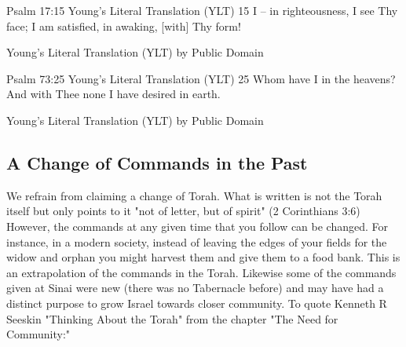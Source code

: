 \documentclass[11pt]{article}
\begin{document}
Psalm 17:15 Young's Literal Translation (YLT)
15 I -- in righteousness, I see Thy face; I am satisfied, in awaking, [with] Thy form!

Young's Literal Translation (YLT)
by Public Domain

Psalm 73:25 Young's Literal Translation (YLT)
25 Whom have I in the heavens? And with Thee none I have desired in earth.

Young's Literal Translation (YLT)
by Public Domain

\subsection{A Change of Commands in the Past} \label{a change of commands in the past}
We refrain from claiming a change of Torah. What is written is not the Torah itself but only points to it "not of letter, but of spirit" (2 Corinthians 3:6) However, the commands at any given time that you follow can be changed. For instance, in a modern society, instead of leaving the edges of your fields for the widow and orphan you might harvest them and give them to a food bank. This is an extrapolation of the commands in the Torah. Likewise some of the commands given at Sinai were new (there was no Tabernacle before) and may have had a distinct purpose to grow Israel towards closer community. To quote Kenneth R Seeskin "Thinking About the Torah" from the chapter "The Need for Community:" 
\end{document}
